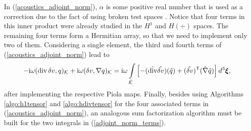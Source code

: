In (\ref{acoustics_adjoint_norm}), $\alpha$ is some positive real number that is used as a correction due to the fact of using broken test spaces \cite{petrides2017adaptive}. Notice that four terms in this inner product were already studied in the $H^1$ and $H(\div)$ spaces. The remaining four terms form a Hermitian array, so that we need to implement only two of them. Considering a single element, the third and fourth terms of (\ref{acoustics_adjoint_norm}) lead to
%
\begin{equation}
    -\mathrm{i}\omega(\operatorname{div} \delta v,q)_{\mathcal{K}} +\mathrm{i}\omega(\delta v, \nabla q)_{\mathcal{K}}=
    \mathrm{i}\omega\int\limits_{\hat{\mathcal{K}}}\left[-(\hat{\operatorname{div}}\hat{\delta v})(\hat{q})+ (\hat{\delta v})^{\mathsf{T}}(\hat{\nabla}\hat{q}) \right]d^3\boldsymbol{\xi},
\label{adjoint_norm_terms}
\end{equation}
%
after implementing the respective Piola maps. Finally, besides using Algorithms \ref{algo:h1tensor} and \ref{algo:hdivtensor} for the four associated terms in (\ref{acoustics_adjoint_norm}), an analogous sum factorization algorithm must be built for the two integrals in (\ref{adjoint_norm_terms}).

